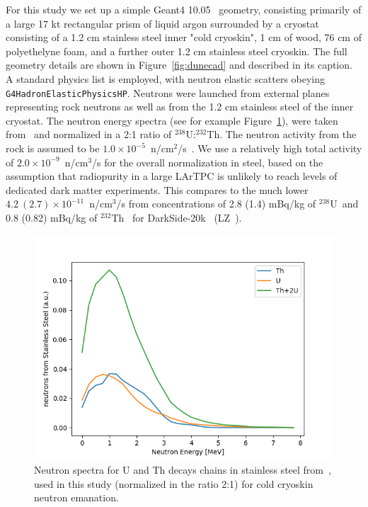 \documentclass[a4paper,11pt]{article}
\newcommand{\ur}{$^{238}$U}
\newcommand{\thr}{$^{232}$Th}
\begin{document}
For this study we set up a simple Geant4 10.05~\cite{Geant4} geometry, consisting primarily of a large 17 kt rectangular prism of liquid argon surrounded by a cryostat consisting of a 1.2 cm stainless steel inner "cold cryoskin", 1 cm of wood, 76 cm of polyethelyne foam, and a further outer 1.2 cm stainless steel cryoskin. The full geometry details are shown in Figure~\ref{fig:dunecad} and described in its caption.  A standard physics list is employed, with neutron elastic scatters obeying {\tt G4HadronElasticPhysicsHP}. Neutrons were launched from external planes representing rock neutrons as well as from the 1.2 cm stainless steel of the inner cryostat. The neutron energy spectra (see for example Figure~\ref{fig:neutrons}), were taken from~\cite{vk} and normalized in a 2:1 ratio of \ur:\thr. The neutron activity from the rock is assumed to be $1.0 \times 10^{-5}$~n/cm$^{2}$/s~\cite{cavernRock}. We use a relatively high total activity of $2.0 \times 10^{-9}$~n/cm$^3$/s for the overall normalization in steel, based on the assumption that radiopurity in a large LArTPC is unlikely to reach levels of dedicated dark matter experiments. This compares to the much lower $4.2~(2.7) \times 10^{-11}$~n/cm$^3$/s from  concentrations of 2.8 (1.4) mBq/kg of \ur~and 0.8 (0.82) mBq/kg of \thr~ for DarkSide-20k~\cite{agnes2018darkside} (LZ~\cite{LZ}).

\begin{figure}[ht]
\begin{centering}
\includegraphics[width=0.90\columnwidth]{Figures/neutrons_vk_11-June-2020.png}
\end{centering}
\caption{Neutron spectra for  U and Th decays chains in stainless steel from~\cite{vk}, used in this study (normalized in the ratio 2:1) for cold cryoskin neutron emanation.
\label{fig:neutrons}}
\end{figure}
\end{document}

